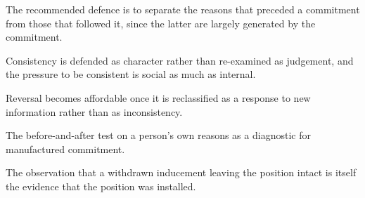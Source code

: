 

\begin{distilled}
  \item The recommended defence is to separate the reasons that preceded a commitment from those that followed it, since the latter are largely generated by the commitment.
  \item Consistency is defended as character rather than re-examined as judgement, and the pressure to be consistent is social as much as internal.
  \item Reversal becomes affordable once it is reclassified as a response to new information rather than as inconsistency.
\end{distilled}

\begin{unique}
  \item The before-and-after test on a person's own reasons as a diagnostic for manufactured commitment.
  \item The observation that a withdrawn inducement leaving the position intact is itself the evidence that the position was installed.
\end{unique}

